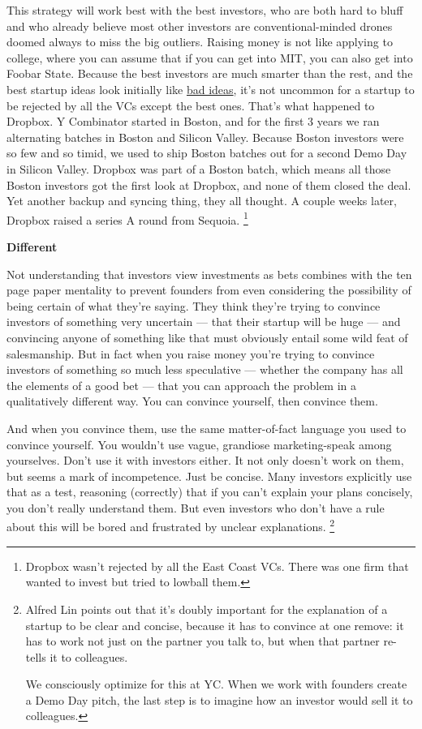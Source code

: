 This strategy will work best with the best investors, who are both hard
to bluff and who already believe most other investors are
conventional-minded drones doomed always to miss the big outliers.
Raising money is not like applying to college, where you can assume that
if you can get into MIT, you can also get into Foobar State. Because the
best investors are much smarter than the rest, and the best startup
ideas look initially like \href{startupideas.html}{bad ideas}, it's not
uncommon for a startup to be rejected by all the VCs except the best
ones. That's what happened to Dropbox. Y Combinator started in Boston,
and for the first 3 years we ran alternating batches in Boston and
Silicon Valley. Because Boston investors were so few and so timid, we
used to ship Boston batches out for a second Demo Day in Silicon Valley.
Dropbox was part of a Boston batch, which means all those Boston
investors got the first look at Dropbox, and none of them closed the
deal. Yet another backup and syncing thing, they all thought. A couple
weeks later, Dropbox raised a series A round from Sequoia.
\footnote{Dropbox wasn't rejected by all the East Coast VCs. There was
one firm that wanted to invest but tried to lowball them.}

\textbf{Different}

Not understanding that investors view investments as bets combines with
the ten page paper mentality to prevent founders from even considering
the possibility of being certain of what they're saying. They think
they're trying to convince investors of something very uncertain ---
that their startup will be huge --- and convincing anyone of something
like that must obviously entail some wild feat of salesmanship. But in
fact when you raise money you're trying to convince investors of
something so much less speculative --- whether the company has all the
elements of a good bet --- that you can approach the problem in a
qualitatively different way. You can convince yourself, then convince
them.

And when you convince them, use the same matter-of-fact language you
used to convince yourself. You wouldn't use vague, grandiose
marketing-speak among yourselves. Don't use it with investors either. It
not only doesn't work on them, but seems a mark of incompetence. Just be
concise. Many investors explicitly use that as a test, reasoning
(correctly) that if you can't explain your plans concisely, you don't
really understand them. But even investors who don't have a rule about
this will be bored and frustrated by unclear explanations.
\footnote{Alfred Lin points out that it's doubly important for the
explanation of a startup to be clear and concise, because it has to
convince at one remove: it has to work not just on the partner you talk
to, but when that partner re-tells it to colleagues.

We consciously optimize for this at YC. When we work with founders
create a Demo Day pitch, the last step is to imagine how an investor
would sell it to colleagues.}

